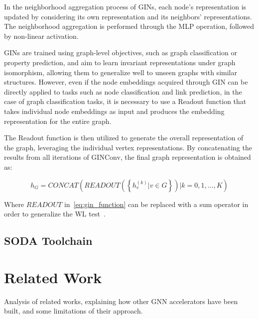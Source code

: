 \documentclass{Configuration_Files/PoliMi3i_thesis}
\begin{document}
    In the neighborhood aggregation process of GINs, each node's representation is updated by considering its own representation and its neighbors' representations.
    The neighborhood aggregation is performed through the MLP operation, followed by non-linear activation.

    GINs are trained using graph-level objectives, such as graph classification or property prediction, and aim to learn invariant representations under graph isomorphism, allowing them to generalize well to unseen graphs with similar structures.
    However, even if the node embeddings acquired through GIN can be directly applied to tasks such as node classification and link prediction, in the case of graph classification tasks, it is necessary to use a Readout function that takes individual node embeddings as input and produces the embedding representation for the entire graph.

    The Readout function is then utilized to generate the overall representation of the graph, leveraging the individual vertex representations.
    By concatenating the results from all iterations of GINConv, the final graph representation is obtained as:

    \begin{equation}
        \label{eq:gin_readout}
        h_G = CONCAT \left( READOUT \left( \left\{ h_v^{(k)} | v \in G \right\} \right) | k = 0, 1, ..., K \right)
    \end{equation}

    Where $READOUT$ in~\ref{eq:gin_function} can be replaced with a sum operator in order to generalize the WL test~\cite{xu2019powerful}.

    \section{SODA Toolchain}




    \chapter{Related Work}
    \label{ch:chapter_three}%

    Analysis of related works, explaining how other GNN accelerators have been built, and some
    limitations of their approach.
\end{document}
